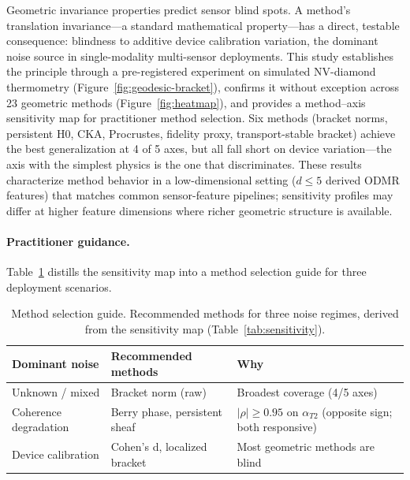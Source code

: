 \documentclass[11pt]{article}
\begin{document}
Geometric invariance properties predict sensor blind spots.  A
method's translation invariance---a standard mathematical
property---has a direct, testable consequence: blindness to additive
device calibration variation, the dominant noise source in
single-modality multi-sensor deployments.  This study establishes the
principle through a pre-registered experiment on simulated NV-diamond
thermometry (Figure~\ref{fig:geodesic-bracket}), confirms it without
exception across 23 geometric methods
(Figure~\ref{fig:heatmap}), and provides a method--axis sensitivity map
for practitioner method selection.  Six methods (bracket norms,
persistent H0, CKA, Procrustes, fidelity proxy, transport-stable
bracket) achieve the best generalization at 4 of 5 axes, but all fall
short on device variation---the axis with the simplest physics is the
one that discriminates.  These results characterize method behavior in
a low-dimensional setting ($d \leq 5$ derived ODMR features) that
matches common sensor-feature pipelines; sensitivity profiles may differ
at higher feature dimensions where richer geometric structure is
available.

\paragraph{Practitioner guidance.}
Table~\ref{tab:guide} distills the sensitivity map into a method
selection guide for three deployment scenarios.

\begin{table}[h]
\centering
\caption{Method selection guide.  Recommended methods for three
  noise regimes, derived from the sensitivity map
  (Table~\ref{tab:sensitivity}).}
\label{tab:guide}
\small
\begin{tabular}{@{}lll@{}}
\toprule
Dominant noise & Recommended methods & Why \\
\midrule
Unknown / mixed & Bracket norm (raw) & Broadest coverage (4/5 axes) \\
Coherence degradation & Berry phase, persistent sheaf & $|\rho| \geq 0.95$ on $\alpha_{T2}$ (opposite sign; both responsive) \\
Device calibration & Cohen's d, localized bracket & Most geometric methods are blind \\
\bottomrule
\end{tabular}
\end{table}
\end{document}

